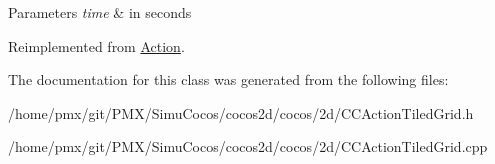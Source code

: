 \begin{DoxyParams}{Parameters}
{\em time} & in seconds \\
\hline
\end{DoxyParams}


Reimplemented from \hyperlink{classAction_a937e646e63915e33ad05ba149bfcf239}{Action}.



The documentation for this class was generated from the following files\+:\begin{DoxyCompactItemize}
\item 
/home/pmx/git/\+P\+M\+X/\+Simu\+Cocos/cocos2d/cocos/2d/C\+C\+Action\+Tiled\+Grid.\+h\item 
/home/pmx/git/\+P\+M\+X/\+Simu\+Cocos/cocos2d/cocos/2d/C\+C\+Action\+Tiled\+Grid.\+cpp\end{DoxyCompactItemize}
